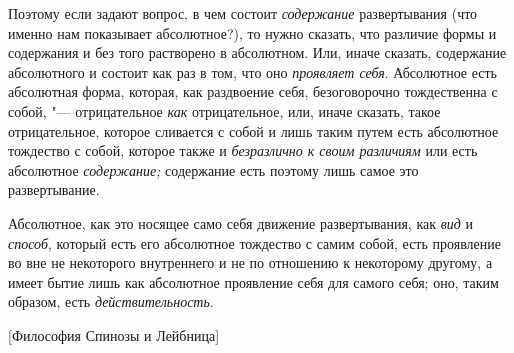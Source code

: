 Поэтому если задают вопрос, в чем состоит
{\em содержание} развертывания (что именно нам
показывает абсолютное?), то нужно сказать, что различие формы и содержания
и без того растворено в абсолютном. Или, иначе сказать, содержание
абсолютного и состоит как раз в том, что оно
{\em проявляет себя}. Абсолютное есть абсолютная форма,
которая, как раздвоение себя, безоговорочно тождественна с собой, "---
отрицательное {\em как} отрицательное, или, иначе
сказать, такое отрицательное, которое сливается с собой и лишь таким путем
есть абсолютное тождество с собой, которое также и
{\em безразлично к своим различиям} или есть абсолютное
{\em содержание;} содержание есть поэтому лишь самое это развертывание.

Абсолютное, как это носящее само себя движение развертывания, как
{\em вид} и {\em способ}, который
есть его абсолютное тождество с самим собой, есть проявление во вне не
некоторого внутреннего и не по отношению к некоторому другому, а имеет
бытие лишь как абсолютное проявление себя для самого себя; оно, таким
образом, есть {\em действительность}.

%
  {[Философия Спинозы и Лейбница]}


